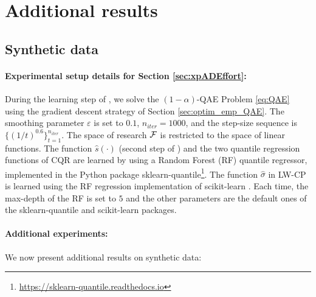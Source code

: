 \section{Additional results} \label{sec:add_xp}

\subsection{Synthetic data}\label{sec:add_xp_synth}
\paragraph{Experimental setup details for Section \ref{sec:xpADEffort}:}
During the learning step of \methodAD, we solve the $(1-\alpha)$-QAE Problem \eqref{eq:QAE} using the gradient descent strategy of Section \ref{sec:optim_emp_QAE}. The smoothing parameter $\varepsilon$ is set to $0.1$, $n_{iter}=1000$, and the step-size sequence is $\{(1/t)^{0.6}\}^{n_{iter}}_{t=1}$. The space of research $\mathcal{F}$ is restricted to the space of linear functions. The function $\hat{s}(\cdot)$ (second step of \methodAD) and the two quantile regression functions of CQR are learned by using a Random Forest (RF) quantile regressor, implemented in the Python package sklearn-quantile\footnote{\href{https://sklearn-quantile.readthedocs.io}{https://sklearn-quantile.readthedocs.io}}. The function $\hat{\sigma}$ in LW-CP is learned using the RF regression implementation of scikit-learn \citep{scikit-learn}. Each time, the max-depth of the RF is set to $5$ and the other parameters are the default ones of the sklearn-quantile and scikit-learn packages.

\paragraph{Additional experiments:} We now present additional results on synthetic data:

